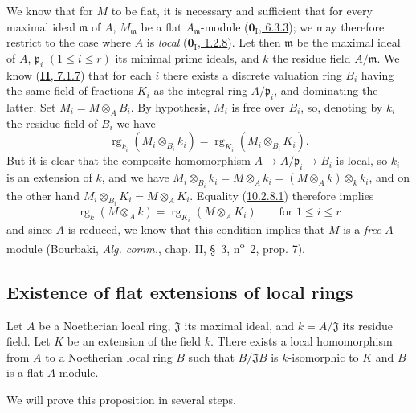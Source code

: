 We know that for $M$ to be flat, it is necessary and sufficient that for every
maximal ideal $\mathfrak m$ of $A$, $M_{\mathfrak m}$ be a flat
$A_{\mathfrak m}$-module
(\hyperref[0.6.3.3]{$\mathbf{0}_{\mathrm I}$, 6.3.3}); we may therefore restrict to the case
where $A$ is \emph{local} (\hyperref[0.1.2.8]{$\mathbf{0}_{\mathrm I}$, 1.2.8}).
Let then $\mathfrak m$ be the maximal ideal of $A$, $\mathfrak p_i$
$(1\leq i\leq r)$ its minimal prime ideals, and $k$ the residue field
$A/\mathfrak m$. We know (\hyperref[II.7.1.7]{\textbf{II}, 7.1.7}) that for each
$i$ there exists a discrete valuation ring $B_i$ having the same field of
fractions $K_i$ as the integral ring $A/\mathfrak p_i$, and dominating the
latter. Set $M_i=M\otimes_A B_i$. By hypothesis, $M_i$ is free over
$B_i$, so, denoting by $k_i$ the residue field of $B_i$ we have
\[
\label{0.10.2.8.1}
  \operatorname{rg}_{k_i}(M_i\otimes_{B_i}k_i)
  =\operatorname{rg}_{K_i}(M_i\otimes_{B_i}K_i).
  \tag{10.2.8.1}
\]
But it is clear that the composite homomorphism
$A\to A/\mathfrak p_i\to B_i$ is local, so $k_i$ is an extension of $k$,
and we have
$M_i\otimes_{B_i}k_i=M\otimes_A k_i=(M\otimes_A k)\otimes_k k_i$, and on
the other hand $M_i\otimes_{B_i}K_i=M\otimes_A K_i$. Equality
(\hyperref[0.10.2.8.1]{10.2.8.1}) therefore implies
\[
  \operatorname{rg}_k(M\otimes_A k)=\operatorname{rg}_{K_i}(M\otimes_A K_i)
  \qquad\text{for }1\leq i\leq r
\]
and since $A$ is reduced, we know that this condition implies that $M$ is a
\emph{free} $A$-module (Bourbaki, \emph{Alg. comm.}, chap. II, \S~3,
n\textsuperscript{o}~2, prop. 7).

\subsection{Existence of flat extensions of local rings}
\label{subsection:0.10.3}

\begin{proposition}[10.3.1]
\label{0.10.3.1}
Let $A$ be a Noetherian local ring, $\mathfrak J$ its maximal ideal, and
$k=A/\mathfrak J$ its residue field. Let $K$ be an extension of the field $k$. There
exists a local homomorphism from $A$ to a Noetherian local ring $B$ such
that $B/\mathfrak J B$ is $k$-isomorphic to $K$ and $B$ is a flat
$A$-module.
\end{proposition}

We will prove this proposition in several steps.


